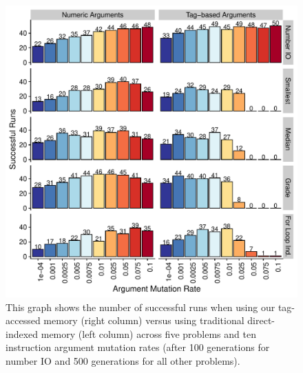\begin{figure}
  \centering
  \includegraphics[width=0.75\columnwidth]{chapters/06-tag-access-memory/media/problem-solving-success.pdf}
  \caption{\small 
  This graph shows the number of successful runs when using our tag-accessed memory (right column) versus using traditional direct-indexed memory (left column) across five problems and ten instruction argument mutation rates (after 100 generations for number IO and 500 generations for all other problems).
  }
  \label{chapter:tag-accessed-memory:fig:successful-runs}
\end{figure}